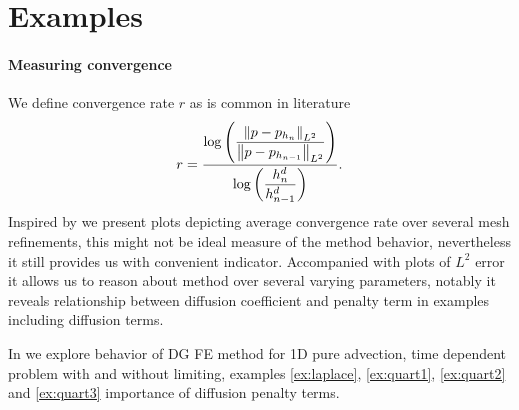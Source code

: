 \section{Examples}

\paragraph{Measuring convergence} We define convergence rate $r$ as is common 
in literature
\begin{equation}
r = \frac{\log\left(\dfrac{\left\lVert p - p_{h_{n}}\right\rVert_{L^2}}{\left\lVert p - p_{h_{n-1}}\right\rVert_{L^2}}\right)}
{\log\left(\dfrac{h^d_{n}}{h^d_{n-1}}\right)}.
\end{equation}
Inspired by \cite{Kucera} we present plots depicting average convergence rate over 
several mesh refinements, this might not be ideal measure of the method behavior, 
nevertheless it still provides us with convenient indicator. Accompanied with plots of 
$L^2$ error it allows us to reason about method over several varying parameters, notably 
it reveals relationship between diffusion coefficient and penalty term in examples 
including diffusion terms.

In  we explore behavior of DG FE method for 1D pure advection, 
time dependent problem with and without limiting, examples \ref{ex:laplace}, 
\ref{ex:quart1}, \ref{ex:quart2} and \ref{ex:quart3} importance of diffusion penalty 
terms. 

